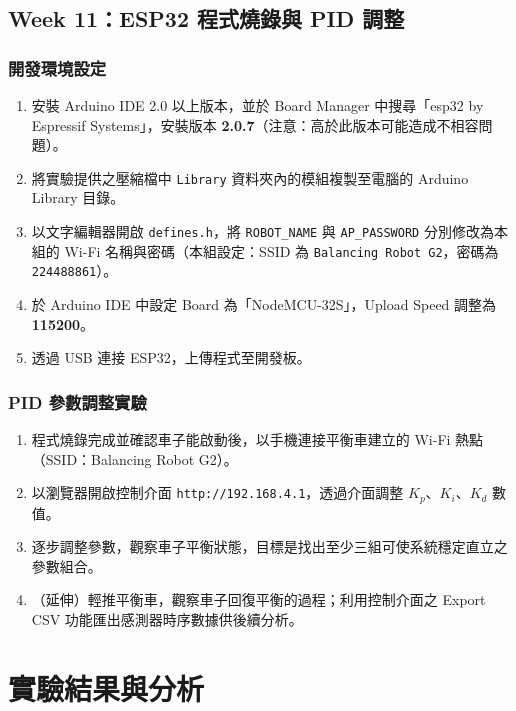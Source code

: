\documentclass[12pt]{article}
\begin{document}
\subsection{Week 11：ESP32 程式燒錄與 PID 調整}

\subsubsection{開發環境設定}

\begin{enumerate}
    \item 安裝 Arduino IDE 2.0 以上版本，並於 Board Manager 中搜尋「esp32 by Espressif Systems」，安裝版本 \textbf{2.0.7}（注意：高於此版本可能造成不相容問題）。
    \item 將實驗提供之壓縮檔中 \texttt{Library} 資料夾內的模組複製至電腦的 Arduino Library 目錄。
    \item 以文字編輯器開啟 \texttt{defines.h}，將 \texttt{ROBOT\_NAME} 與 \texttt{AP\_PASSWORD} 分別修改為本組的 Wi-Fi 名稱與密碼（本組設定：SSID 為 \texttt{Balancing Robot G2}，密碼為 \texttt{224488861}）。
    \item 於 Arduino IDE 中設定 Board 為「NodeMCU-32S」，Upload Speed 調整為 \textbf{115200}。
    \item 透過 USB 連接 ESP32，上傳程式至開發板。
\end{enumerate}

\subsubsection{PID 參數調整實驗}

\begin{enumerate}
    \item 程式燒錄完成並確認車子能啟動後，以手機連接平衡車建立的 Wi-Fi 熱點（SSID：Balancing Robot G2）。
    \item 以瀏覽器開啟控制介面 \texttt{http://192.168.4.1}，透過介面調整 $K_p$、$K_i$、$K_d$ 數值。
    \item 逐步調整參數，觀察車子平衡狀態，目標是找出至少三組可使系統穩定直立之參數組合。
    \item （延伸）輕推平衡車，觀察車子回復平衡的過程；利用控制介面之 Export CSV 功能匯出感測器時序數據供後續分析。
\end{enumerate}


\section{實驗結果與分析}
\end{document}
